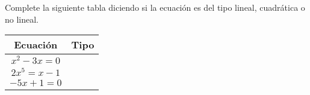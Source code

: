 \documentclass[11pt,a4]{aleph-examen}
\begin{document}
\begin{preguntas}

\item Complete la siguiente tabla diciendo si la ecuación es del tipo lineal, cuadrática o no lineal.
\begin{multicols}{2}
\begin{center}
    \begin{tabular}{c|c}
        Ecuación & \hspace{1cm}Tipo\hspace{1cm}  \\ \midrule
        $x^2 - 3x = 0$ &  \\[2mm]\midrule
        $2x^5  = x - 1$ & \\[2mm]\midrule
        $-5x + 1 = 0$ & \\[2mm]\bottomrule
    \end{tabular}
    

\end{center}
\end{multicols}
\end{preguntas}
\end{document}
